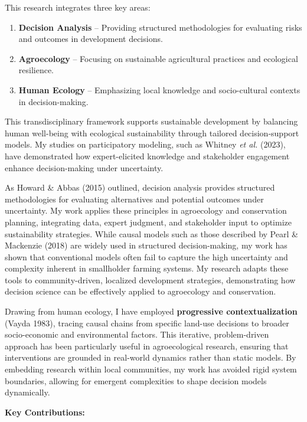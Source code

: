 \documentclass[
]{article}
\begin{document}
This research integrates three key areas:

\begin{enumerate}
\def\labelenumi{\arabic{enumi}.}
\item
  \textbf{Decision Analysis} -- Providing structured methodologies for
  evaluating risks and outcomes in development decisions.
\item
  \textbf{Agroecology} -- Focusing on sustainable agricultural practices
  and ecological resilience.
\item
  \textbf{Human Ecology} -- Emphasizing local knowledge and
  socio-cultural contexts in decision-making.
\end{enumerate}

This transdisciplinary framework supports sustainable development by
balancing human well-being with ecological sustainability through
tailored decision-support models. My studies on participatory modeling,
such as Whitney \emph{et al.} (2023), have demonstrated how
expert-elicited knowledge and stakeholder engagement enhance
decision-making under uncertainty.

As Howard \& Abbas (2015) outlined, decision analysis provides
structured methodologies for evaluating alternatives and potential
outcomes under uncertainty. My work applies these principles in
agroecology and conservation planning, integrating data, expert
judgment, and stakeholder input to optimize sustainability strategies.
While causal models such as those described by Pearl \& Mackenzie (2018)
are widely used in structured decision-making, my work has shown that
conventional models often fail to capture the high uncertainty and
complexity inherent in smallholder farming systems. My research adapts
these tools to community-driven, localized development strategies,
demonstrating how decision science can be effectively applied to
agroecology and conservation.

Drawing from human ecology, I have employed \textbf{progressive
contextualization} (Vayda 1983), tracing causal chains from specific
land-use decisions to broader socio-economic and environmental factors.
This iterative, problem-driven approach has been particularly useful in
agroecological research, ensuring that interventions are grounded in
real-world dynamics rather than static models. By embedding research
within local communities, my work has avoided rigid system boundaries,
allowing for emergent complexities to shape decision models dynamically.

\textbf{Key Contributions:}
\end{document}
